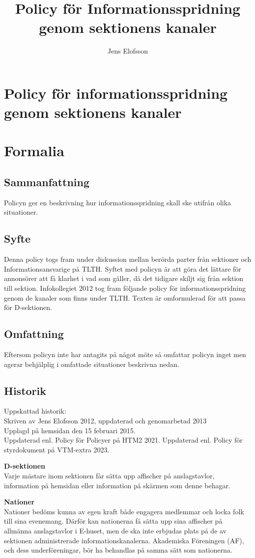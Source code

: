 \documentclass{dsekprotokoll}
\title{Policy för Informationsspridning genom sektionens kanaler}
\author{Jens Elofsson}
\begin{document}
\section*{Policy för informationsspridning genom sektionens kanaler}
\section{Formalia}
\subsection{Sammanfattning}
Policyn ger en beskrivning hur informationsspridning skall ske utifrån olika situationer.
\subsection{Syfte}
Denna policy togs fram under diskussion mellan berörda parter från sektioner och Informationsansvarige på TLTH. Syftet med policyn är att göra det lättare för annonsörer att få klarhet i vad som gäller, då det tidigare skiljt sig från sektion till sektion. Infokollegiet 2012 tog fram följande policy för informationsspridning genom de kanaler som finns under TLTH. Texten är omformulerad för att passa för D-sektionen.

\subsection{Omfattning}
Eftersom policyn inte har antagits på något möte så omfattar policyn inget men agerar behjälplig i omfattade situationer beskrivna nedan.
\subsection{Historik}
Uppskattad historik:\\
Skriven av Jens Elofsson 2012, uppdaterad och genomarbetad 2013 \\
Upplagd på hemsidan den 15 februari 2015. \\
Uppdaterad enl. Policy för Policyer på HTM2 2021. Uppdaterad enl. Policy för styrdokument på VTM-extra 2023.


\textbf{D-sektionen}\\
Varje mästare inom sektionen får sätta upp affischer på anslagstavlor, information på
hemsidan eller information på skärmen som denne behagar.


\textbf{Nationer}\\
Nationer bedöms kunna av egen kraft både engagera medlemmar och locka folk till sina
evenemang. Därför kan nationerna få sätta upp sina affischer på allmänna anslagstavlor i
E-huset, men de ska inte erbjudas plats på de av sektionen administrerade informationskanalerna. Akademiska Föreningen (AF), och dess underföreningar, bör ha behandlas på
samma sätt som nationerna.
\end{document}
